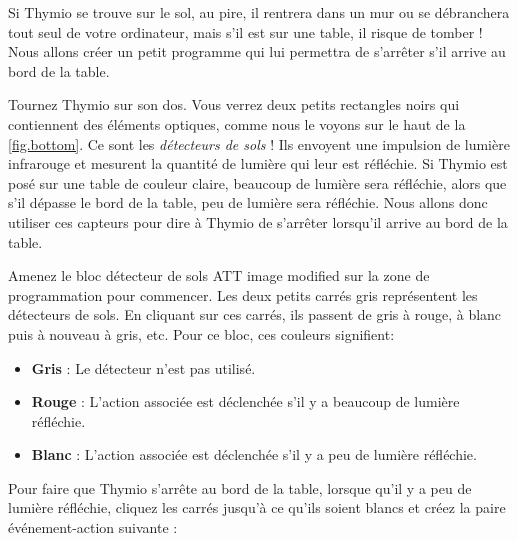 
Si Thymio se trouve sur le sol, au pire, il rentrera dans un mur ou se débranchera tout seul de votre ordinateur, mais s'il est sur une table, il risque de tomber !
Nous allons créer un petit programme qui lui permettra de s'arrêter s'il arrive au bord de la table.


Tournez Thymio sur son dos. Vous verrez deux petits rectangles noirs qui contiennent des éléments optiques, comme nous le voyons sur le haut de la \cref{fig.bottom}.
Ce sont les \emph{détecteurs de sols} !
Ils envoyent une impulsion de lumière infrarouge et mesurent la quantité de lumière qui leur est réfléchie.
Si Thymio est posé sur une table de couleur claire, beaucoup de lumière sera réfléchie, alors que s'il dépasse le bord de la table, peu de lumière sera réfléchie.
Nous allons donc utiliser ces capteurs pour dire à Thymio de s'arrêter lorsqu'il arrive au bord de la table.


Amenez le bloc détecteur de sols  ATT image modified sur la zone de programmation pour commencer.
Les deux petits carrés gris représentent les détecteurs de sols.
En cliquant sur ces carrés, ils passent de gris à rouge, à blanc puis à nouveau à gris, etc. Pour ce bloc, ces couleurs signifient:

\begin{itemize}
\item \textbf{Gris} : Le détecteur n'est pas utilisé.
\item \textbf{Rouge} : L'action associée est déclenchée s'il y a beaucoup de lumière réfléchie.
\item \textbf{Blanc} : L'action associée est déclenchée s'il y a peu de lumière réfléchie.
\end{itemize}


Pour faire que Thymio s'arrête au bord de la table, lorsque qu'il y a peu de lumière réfléchie, cliquez les carrés jusqu'à ce qu'ils soient blancs et créez la paire événement-action suivante : 

